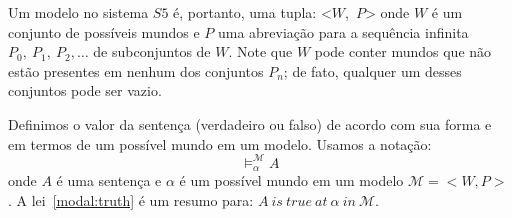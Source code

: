 Um modelo no sistema $S5$ é, portanto, uma tupla:
<$W$,~$P$>
onde $W$ é um conjunto de possíveis mundos e $P$ uma abreviação para a sequência
infinita 
$P_0,\ P_1,\ P_2,\ldots$
de subconjuntos de $W$.
Note que $W$ pode conter mundos que não estão presentes em nenhum dos conjuntos
$P_n$; de fato, qualquer um desses conjuntos pode ser vazio.

Definimos o valor da sentença (verdadeiro ou falso) de acordo com sua forma e em
termos de um possível mundo em um modelo.
Usamos a notação:
\begin{equation}
    \label{modal:truth}
    \models ^{\mathcal{M}}_{\alpha} A 
\end{equation}
onde $A$ é uma sentença e $\alpha$ é um possível mundo em um modelo
$\mathcal{M}=<W,P>$.
A lei~\ref{modal:truth} é um resumo para: $A\ is\ true\ at\ \alpha\ in\
\mathcal{M}$.


